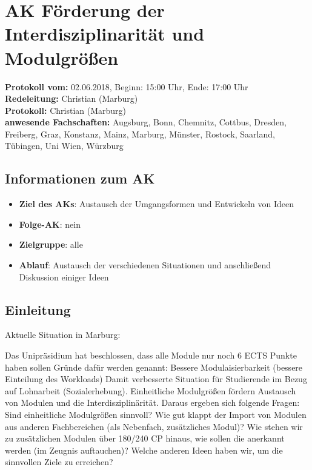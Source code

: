 \newpage
\section{AK Förderung der Interdisziplinarität und Modulgrößen}

  \textbf{Protokoll vom:} 02.06.2018,
  Beginn: 15:00 Uhr,
  Ende: 17:00 Uhr \\
  \textbf{Redeleitung:} Christian (Marburg) \\
  \textbf{Protokoll:} Christian (Marburg) \\
  \textbf{anwesende Fachschaften:} Augsburg, Bonn, Chemnitz, Cottbus, Dresden, Freiberg, Graz, Konstanz, Mainz, Marburg, Münster, Rostock, Saarland, Tübingen, Uni Wien, Würzburg

  \subsection*{Informationen zum AK}
    \begin{itemize}
      \item \textbf{Ziel des AKs}: Austausch der Umgangsformen und Entwickeln von Ideen
      \item \textbf{Folge-AK}: nein
      \item \textbf{Zielgruppe}: alle
      \item \textbf{Ablauf}: Austausch der verschiedenen Situationen und anschließend Diskussion einiger Ideen
    \end{itemize}

  \subsection*{Einleitung}
    Aktuelle Situation in Marburg:
    \begin{outline}
      \1 Das Unipräsidium hat beschlossen, dass alle Module nur noch 6 ECTS Punkte haben sollen
      \1 Gründe dafür werden genannt:
        \2 Bessere Modulaisierbarkeit (bessere Einteilung des Workloads)
        \2 Damit verbesserte Situation für Studierende im Bezug auf Lohnarbeit (Sozialerhebung).
        \2 Einheitliche Modulgrößen fördern Austausch von Modulen und die Interdisziplinärität.
      \1 Daraus ergeben sich folgende Fragen:
        \2 Sind einheitliche Modulgrößen sinnvoll?
        \2 Wie gut klappt der Import von Modulen aus anderen Fachbereichen (als Nebenfach, zusätzliches Modul)?
        \2 Wie stehen wir zu zusätzlichen Modulen über 180/240 CP hinaus, wie sollen die anerkannt werden (im Zeugnis auftauchen)?
        \2 Welche anderen Ideen haben wir, um die sinnvollen Ziele zu erreichen?
    \end{outline}

